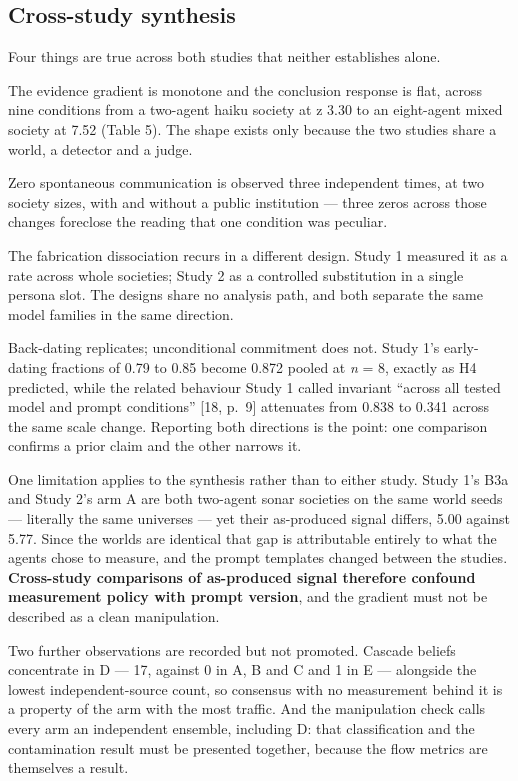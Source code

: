 \documentclass[pdflatex,sn-basic]{sn-jnl}
\begin{document}
\hypertarget{cross-study-synthesis}{%
\subsection{Cross-study synthesis}\label{cross-study-synthesis}}

Four things are true across both studies that neither establishes alone.

The evidence gradient is monotone and the conclusion response is flat, across nine
conditions from a two-agent haiku society at \textbar z\textbar{} 3.30 to an eight-agent mixed society at
7.52 (Table 5). The shape exists only because the two studies share a world, a detector and
a judge.

Zero spontaneous communication is observed three independent times, at two society sizes,
with and without a public institution --- three zeros across those changes foreclose the
reading that one condition was peculiar.

The fabrication dissociation recurs in a different design. Study 1 measured it as a
rate across whole societies; Study 2 as a controlled substitution in a single persona
slot. The designs share no analysis path, and both separate the same model families in the
same direction.

Back-dating replicates; unconditional commitment does not. Study 1's early-dating
fractions of 0.79 to 0.85 become 0.872 pooled at \emph{n} = 8, exactly as H4 predicted, while the related behaviour Study 1 called invariant ``across all tested model and prompt
conditions'' {[}18, p.~9{]} attenuates from 0.838 to 0.341 across the same scale change. Reporting both
directions is the point: one comparison confirms a prior claim and the other narrows it.

One limitation applies to the synthesis rather than to either study. Study 1's B3a and Study 2's
arm A are both two-agent sonar societies on the same world seeds --- literally the same universes
--- yet their as-produced signal differs, 5.00 against 5.77. Since the worlds are identical that gap is attributable entirely to what the agents chose
to measure, and the prompt templates changed between the studies. \textbf{Cross-study
comparisons of as-produced signal therefore confound measurement policy with prompt
version}, and the gradient must not be described as a clean manipulation.

Two further observations are recorded but not promoted. Cascade beliefs concentrate in D ---
17, against 0 in A, B and C and 1 in E --- alongside the lowest independent-source count, so
consensus with no measurement behind it is a property of the arm with the most traffic.
And the manipulation check calls every arm an independent ensemble, including D: that
classification and the contamination result must be presented together, because the flow
metrics are themselves a result.
\end{document}
